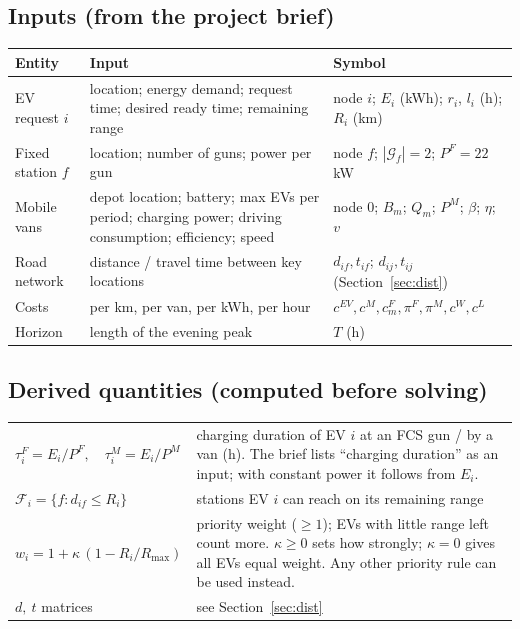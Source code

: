 \documentclass[11pt,a4paper]{article}
\newcommand{\F}{\mathcal{F}}
\newcommand{\G}{\mathcal{G}}
\begin{document}
\subsection{Inputs (from the project brief)}
\begin{tabularx}{\textwidth}{@{}>{\raggedright\arraybackslash}p{3.0cm}>{\raggedright\arraybackslash}p{5.6cm}X@{}}
\toprule
\textbf{Entity} & \textbf{Input} & \textbf{Symbol} \\
\midrule
EV request $i$ & location; energy demand; request time; desired ready time; remaining range & node $i$; $E_i$ (kWh); $r_i$, $l_i$ (h); $R_i$ (km) \\
Fixed station $f$ & location; number of guns; power per gun & node $f$; $|\G_f|=2$; $P^F=22$\,kW \\
Mobile vans & depot location; battery; max EVs per period; charging power; driving consumption; efficiency; speed & node $0$; $B_m$; $Q_m$; $P^M$; $\beta$; $\eta$; $v$ \\
Road network & distance / travel time between key locations & $d_{if},t_{if}$; $d_{ij},t_{ij}$ (Section~\ref{sec:dist}) \\
Costs & per km, per van, per kWh, per hour & $c^{EV},c^M,c^F_m,\pi^F,\pi^M,c^W,c^L$ \\
Horizon & length of the evening peak & $T$ (h) \\
\bottomrule
\end{tabularx}

\subsection{Derived quantities (computed before solving)}
\begin{tabularx}{\textwidth}{@{}>{\raggedright\arraybackslash}p{5.0cm}X@{}}
\toprule
$\tau^F_i=E_i/P^F,\quad \tau^M_i=E_i/P^M$ & charging duration of EV $i$ at an FCS gun / by a van (h). The brief lists ``charging duration'' as an input; with constant power it follows from $E_i$. \\
$\F_i=\{f: d_{if}\le R_i\}$ & stations EV $i$ can reach on its remaining range \\
$w_i=1+\kappa\,(1-R_i/R_{\max})$ & priority weight ($\ge1$); EVs with little range left count more. $\kappa\ge0$ sets how strongly; $\kappa=0$ gives all EVs equal weight. Any other priority rule can be used instead. \\
$d,\ t$ matrices & see Section~\ref{sec:dist} \\
\bottomrule
\end{tabularx}
\end{document}
